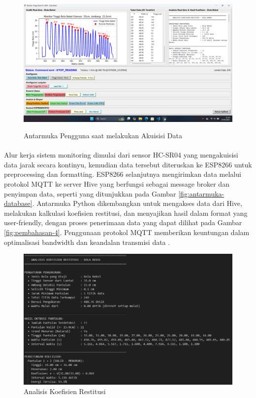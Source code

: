 \begin{figure}[!htbp]
    \centering
    \includegraphics[width=0.5\linewidth]{images/Screenshot (8).png}
    \caption{Antarmuka Pengguna saat melakukan Akuisisi Data}
    \citep{ajitot2024koefisien}
    \label{fig:antarmuka-gui-akuisisi}
\end{figure}

\paragraph{}Alur kerja sistem monitoring dimulai dari sensor HC-SR04 yang mengakuisisi data jarak secara kontinyu, kemudian data tersebut diteruskan ke ESP8266 untuk preprocessing dan formatting. ESP8266 selanjutnya mengirimkan data melalui protokol MQTT ke server Hive yang berfungsi sebagai message broker dan penyimpan data, seperti yang ditunjukkan pada Gambar \ref{fig:antarmuka-database}. Antarmuka Python dikembangkan untuk mengakses data dari Hive, melakukan kalkulasi koefisien restitusi, dan menyajikan hasil dalam format yang user-friendly, dengan proses penerimaan data yang dapat dilihat pada Gambar \ref{fig:pembahasan-4}. Penggunaan protokol MQTT memberikan keuntungan dalam optimalisasi bandwidth dan keandalan transmisi data \citep{thompson2020mqtt}.

\begin{figure}[!htbp]
    \centering
    \includegraphics[width=0.5\linewidth]{images/Analisis-Koefisien-Restitusi.png}
    \caption{Analisis Koefisien Restitusi}
    \label{fig:pembahasan-6}
\end{figure}

